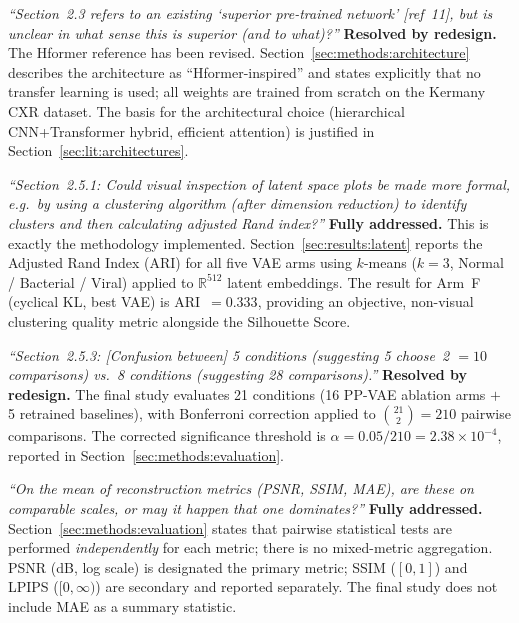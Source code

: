 \documentclass[12pt, a4paper, twoside, openright]{book}
\begin{document}
\begin{appendices}
\textit{``Section~2.3 refers to an existing `superior pre-trained network' [ref~11], but is unclear in what sense this is superior (and to what)?''}
\textbf{Resolved by redesign.} The Hformer reference has been revised. Section~\ref{sec:methods:architecture} describes the architecture as ``Hformer-inspired'' and states explicitly that no transfer learning is used; all weights are trained from scratch on the Kermany CXR dataset. The basis for the architectural choice (hierarchical CNN+Transformer hybrid, efficient attention) is justified in Section~\ref{sec:lit:architectures}.

\textit{``Section~2.5.1: Could visual inspection of latent space plots be made more formal, e.g.\ by using a clustering algorithm (after dimension reduction) to identify clusters and then calculating adjusted Rand index?''}
\textbf{Fully addressed.} This is exactly the methodology implemented. Section~\ref{sec:results:latent} reports the Adjusted Rand Index (ARI) for all five VAE arms using $k$-means ($k=3$, Normal / Bacterial / Viral) applied to $\mathbb{R}^{512}$ latent embeddings. The result for Arm~F (cyclical KL, best VAE) is ARI~$=0.333$, providing an objective, non-visual clustering quality metric alongside the Silhouette Score.

\textit{``Section~2.5.3: [Confusion between] 5 conditions (suggesting 5 choose~2 $= 10$ comparisons) vs.\ 8 conditions (suggesting 28 comparisons).''}
\textbf{Resolved by redesign.} The final study evaluates 21 conditions (16 PP-VAE ablation arms $+$ 5 retrained baselines), with Bonferroni correction applied to $\binom{21}{2} = 210$ pairwise comparisons. The corrected significance threshold is $\alpha = 0.05/210 = 2.38 \times 10^{-4}$, reported in Section~\ref{sec:methods:evaluation}.

\textit{``On the mean of reconstruction metrics (PSNR, SSIM, MAE), are these on comparable scales, or may it happen that one dominates?''}
\textbf{Fully addressed.} Section~\ref{sec:methods:evaluation} states that pairwise statistical tests are performed \emph{independently} for each metric; there is no mixed-metric aggregation. PSNR (dB, log scale) is designated the primary metric; SSIM ($[0,1]$) and LPIPS ($[0,\infty)$) are secondary and reported separately. The final study does not include MAE as a summary statistic.


\end{appendices}
\end{document}
